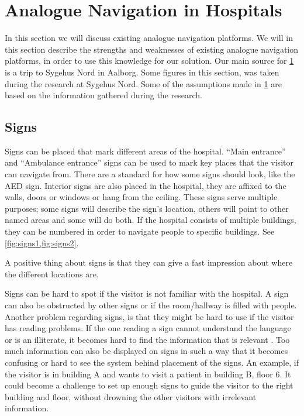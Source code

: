 \section{Analogue Navigation in Hospitals} %
\label{sec:anal_nav}
In this section we will discuss existing analogue navigation platforms. We will in this section describe the strengths and weaknesses of existing analogue navigation platforms, in order to use this knowledge for our solution. Our main source for \cref{sec:anal_nav} is a trip to Sygehus Nord in Aalborg. Some figures in this section, was taken during the research at Sygehus Nord. Some of the assumptions made in \cref{sec:anal_nav} are based on the information gathered during the research. 

\subsection{Signs} \label{sub:sign}
Signs can be placed that mark different areas of the hospital. \enquote{Main entrance} and \enquote{Ambulance entrance}\cite{signs_hospital} signs can be used to mark key places that the visitor can navigate from\cite{art_Osborne}. There are a standard for how some signs should look, like the AED sign\cite{Signs_AED}.
Interior signs are also placed in the hospital, they are affixed to the walls, doors or windows or hang from the ceiling. These signs serve multiple purposes; some signs will describe the sign's location, others will point to other named areas and some will do both. 
If the hospital consists of multiple buildings, they can be numbered in order to navigate people to specific buildings. See \cref{fig:signs1,fig:signs2}.

A positive thing about signs is that they can give a fast impression about where the different locations are.

Signs can be hard to spot if the visitor is not familiar with the hospital. A sign can also be obstructed by other signs or if the room/hallway is filled with people. Another problem regarding signs, is that they might be hard to use if the visitor has reading problems. If the one reading a sign cannot understand the language or is an illiterate, it becomes hard to find the information that is relevant \cite{signs_reading}. Too much information can also be displayed on signs in such a way that it becomes confusing or hard to see the system behind placement of the signs.
An example, if the visitor is in building A and wants to visit a patient in building B, floor 6. It could become a challenge to set up enough signs to guide the visitor to the right building and floor, without drowning the other visitors with irrelevant information.

